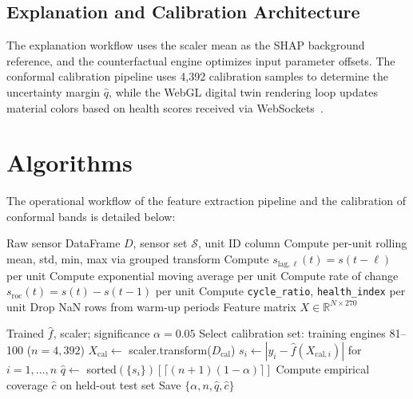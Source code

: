 \documentclass[letterpaper, 10 pt, conference]{ieeeconf}
\begin{document}
\subsection{Explanation and Calibration Architecture}
\label{subsec:xai_cal_arch}
The explanation workflow uses the scaler mean as the SHAP background reference, and the counterfactual engine optimizes input parameter offsets. The conformal calibration pipeline uses 4,392 calibration samples to determine the uncertainty margin $\hat{q}$, while the WebGL digital twin rendering loop updates material colors based on health scores received via WebSockets~\cite{ws}.

\section{Algorithms}
\label{sec:algorithms}

The operational workflow of the feature extraction pipeline and the calibration of conformal bands is detailed below:

\begin{algorithm}[H]
\caption{Feature Engineering Pipeline}
\begin{algorithmic}[1]
\REQUIRE Raw sensor DataFrame $D$, sensor set $\mathcal{S}$, unit ID column
    \STATE Compute per-unit rolling mean, std, min, max via grouped transform
  \ENDFOR
    \STATE Compute $s_{\mathrm{lag},\ell}(t) = s(t-\ell)$ per unit
  \ENDFOR
    \STATE Compute exponential moving average per unit
  \ENDFOR
  \STATE Compute rate of change $s_\mathrm{roc}(t) = s(t)-s(t-1)$ per unit
\ENDFOR
\STATE Compute \texttt{cycle\_ratio}, \texttt{health\_index} per unit
\STATE Drop NaN rows from warm-up periods
\RETURN Feature matrix $X \in \mathbb{R}^{N \times 270}$
\end{algorithmic}
\end{algorithm}

\begin{algorithm}[H]
\caption{Split Conformal Calibration}
\begin{algorithmic}[1]
\REQUIRE Trained $\hat{f}$, scaler; significance $\alpha = 0.05$
\STATE Select calibration set: training engines 81--100 ($n = 4{,}392$)
\STATE $X_\mathrm{cal} \leftarrow$ scaler.transform($D_\mathrm{cal}$)
\STATE $s_i \leftarrow |y_i - \hat{f}(X_{\mathrm{cal},i})|$ for $i=1,\dots,n$
\STATE $\hat{q} \leftarrow$ sorted$(\{s_i\})[\lceil(n+1)(1-\alpha)\rceil]$
\STATE Compute empirical coverage $\hat{c}$ on held-out test set
\STATE Save $\{\alpha, n, \hat{q}, \hat{c}\}$
\end{algorithmic}
\end{algorithm}
\end{document}
